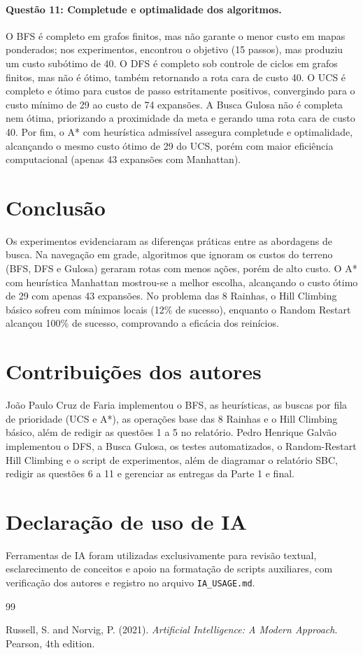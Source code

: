 \documentclass[12pt]{article}
\begin{document}
\paragraph{Questão 11: Completude e optimalidade dos algoritmos.}
O BFS é completo em grafos finitos, mas não garante o menor custo em mapas ponderados; nos experimentos, encontrou o objetivo (15 passos), mas produziu um custo subótimo de 40. O DFS é completo sob controle de ciclos em grafos finitos, mas não é ótimo, também retornando a rota cara de custo 40. O UCS é completo e ótimo para custos de passo estritamente positivos, convergindo para o custo mínimo de 29 ao custo de 74 expansões. A Busca Gulosa não é completa nem ótima, priorizando a proximidade da meta e gerando uma rota cara de custo 40. Por fim, o A* com heurística admissível assegura completude e optimalidade, alcançando o mesmo custo ótimo de 29 do UCS, porém com maior eficiência computacional (apenas 43 expansões com Manhattan).

\section{Conclusão}
Os experimentos evidenciaram as diferenças práticas entre as abordagens de busca. Na navegação em grade, algoritmos que ignoram os custos do terreno (BFS, DFS e Gulosa) geraram rotas com menos ações, porém de alto custo. O A* com heurística Manhattan mostrou-se a melhor escolha, alcançando o custo ótimo de 29 com apenas 43 expansões. No problema das 8 Rainhas, o Hill Climbing básico sofreu com mínimos locais (12\% de sucesso), enquanto o Random Restart alcançou 100\% de sucesso, comprovando a eficácia dos reinícios.

\section*{Contribuições dos autores}
João Paulo Cruz de Faria implementou o BFS, as heurísticas, as buscas por fila de prioridade (UCS e A*), as operações base das 8 Rainhas e o Hill Climbing básico, além de redigir as questões 1 a 5 no relatório. Pedro Henrique Galvão implementou o DFS, a Busca Gulosa, os testes automatizados, o Random-Restart Hill Climbing e o script de experimentos, além de diagramar o relatório SBC, redigir as questões 6 a 11 e gerenciar as entregas da Parte 1 e final.

\section*{Declaração de uso de IA}
Ferramentas de IA foram utilizadas exclusivamente para revisão textual, esclarecimento de conceitos e apoio na formatação de scripts auxiliares, com verificação dos autores e registro no arquivo \texttt{IA\_USAGE.md}.

\begin{thebibliography}{99}
\setlength{\itemsep}{0pt}
\setlength{\parskip}{0pt}

Russell, S. and Norvig, P. (2021). \textit{Artificial Intelligence: A Modern Approach}. Pearson, 4th edition.

\end{thebibliography}
\end{document}
